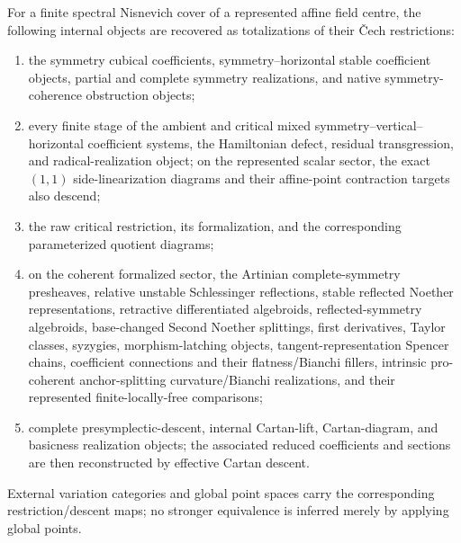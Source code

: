 \begin{theorem}
\label{thm:symmetry-noether-finite-spectral-nisnevich-descent}
For a finite spectral Nisnevich cover of a represented affine field centre, the
following internal objects are recovered as totalizations of their \v{C}ech
restrictions:
\begin{enumerate}
\item the symmetry cubical coefficients, symmetry--horizontal stable coefficient
      objects, partial and complete symmetry realizations, and native
      symmetry-coherence obstruction objects;
\item every finite stage of the ambient and critical mixed
      symmetry--vertical--horizontal coefficient systems, the Hamiltonian defect,
      residual transgression, and radical-realization object; on the represented
      scalar sector, the exact $(1,1)$ side-linearization diagrams and their
      affine-point contraction targets also descend;
\item the raw critical restriction, its formalization, and the corresponding
      parameterized quotient diagrams;
\item on the coherent formalized sector, the Artinian complete-symmetry presheaves,
      relative unstable Schlessinger reflections, stable reflected Noether
      representations, retractive differentiated algebroids, reflected-symmetry
      algebroids, base-changed Second Noether splittings, first derivatives, Taylor
      classes, syzygies, morphism-latching objects, tangent-representation
      Spencer chains, coefficient connections and their flatness/Bianchi fillers,
      intrinsic pro-coherent anchor-splitting curvature/Bianchi realizations, and
      their represented finite-locally-free comparisons;
\item complete presymplectic-descent, internal Cartan-lift, Cartan-diagram, and
      basicness realization objects; the associated reduced coefficients and
      sections are then reconstructed by effective Cartan descent.
\end{enumerate}
External variation categories and global point spaces carry the corresponding
restriction/descent maps; no stronger equivalence is inferred merely by applying
global points.
\end{theorem}

